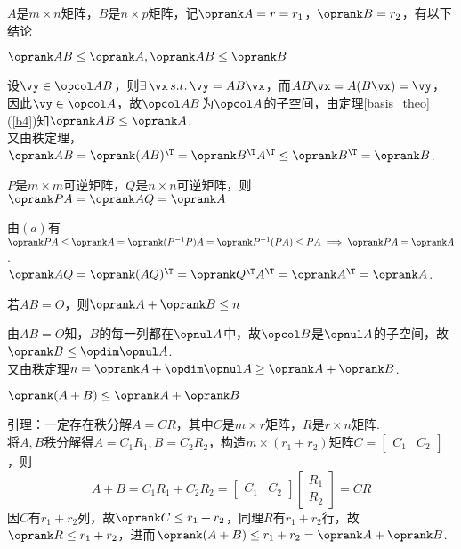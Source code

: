 \begin{theorem}[秩的进阶定理]%
$A$是$m\times n$矩阵，$B$是$n\times p$矩阵，记$\oprank A=r=r_1$，$\oprank B=r_2$，有以下结论
\begin{partlist}
	\item $\oprank AB\leq \oprank A,\oprank AB\leq \oprank B$
	\begin{analysis}
	设$\vy\in\opcol AB$，则$\exists\,\vx\,s.t.\,\vy=AB\vx$，而$AB\vx=A(B\vx)=\vy$，因此$\vy\in\opcol A$，故$\opcol AB$为$\opcol A$的子空间，由定理\ref{basis_theo}(\ref{b4})知$\oprank AB\leq \oprank A$.\\
	又由秩定理，$\oprank AB=\oprank(AB)^\T =\oprank B^\T A^\T \leq\oprank B^\T =\oprank B$.
	\end{analysis}
	\item $P$是$m\times m$可逆矩阵，$Q$是$n\times n$可逆矩阵，则$\oprank PA=\oprank AQ=\oprank A$
	\begin{analysis}
	由$(a)$有$\oprank PA\leq\oprank A=\oprank(P^{-1}P)A=\oprank P^{-1}(PA)\leq PA\implies \oprank PA=\oprank A$.\\
	$\oprank AQ=\oprank (AQ)^\T =\oprank Q^\T A^\T =\oprank A^\T =\oprank A$.
	\end{analysis}
	\item 若$AB=O$，则$\oprank A+\oprank B\leq n$
	\begin{analysis}
	由$AB=O$知，$B$的每一列都在$\opnul A$中，故$\opcol B$是$\opnul A$的子空间，故$\oprank B\leq \opdim\opnul A$.\\
	又由秩定理$n=\oprank A+\opdim \opnul A\geq\oprank A+\oprank B$.
	\end{analysis}
	\item $\oprank(A+B)\leq\oprank A+\oprank B$
	\begin{analysis}
	引理：一定存在秩分解$A=CR$，其中$C$是$m\times r$矩阵，$R$是$r\times n$矩阵.\\
	将$A,B$秩分解得$A=C_1R_1,B=C_2R_2$，构造$m\times (r_1+r_2)$矩阵$C=\begin{bmatrix}C_1&C_2\end{bmatrix}$，则
	\[A+B=C_1R_1+C_2R_2=\begin{bmatrix}C_1&C_2\end{bmatrix}\begin{bmatrix}R_1\\R_2\end{bmatrix}=CR\]
	因$C$有$r_1+r_2$列，故$\oprank C\leq r_1+r_2$，同理$R$有$r_1+r_2$行，故$\oprank R\leq r_1+r_2$，进而$\oprank (A+B)\leq r_1+r_2=\oprank A+\oprank B$.
	\end{analysis}

\end{partlist}
\end{theorem}
